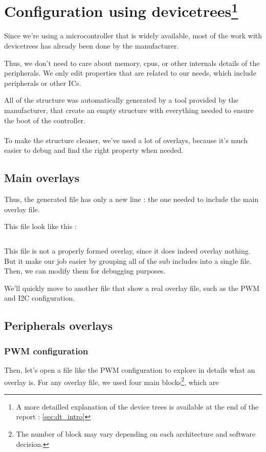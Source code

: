 \section[Configuration using devicetrees]{Configuration using devicetrees\footnote{
      A more detailled explanation of the device trees is available at the end of the report : \ref{sec:dt_intro}
  }}
Since we're using a microcontroller that is widely available, most of the work with
devicetrees has already been done by the manufacturer.

Thus, we don't need to care about memory, cpus, or other internals details of
the peripherals. We only edit properties that are related to our needs, which
include peripherals or other ICs.

All of the structure was automatically generated by a tool provided by the
manufacturer, that create an empty structure with everything needed to ensure
the boot of the controller.

\paragraph{}
To make the structure cleaner, we've used a lot of overlays, because it's much
easier to debug and find the right property when needed.

\subsection{Main overlays}
Thus, the generated file has only a new line : the one needed to include the
main overlay file.

This file look like this :

\inputminted[linenos, firstline=16, lastline=44]{devicetree}{\DeviceTree/topaze-pinctrl.dtsi}

This file is not a properly formed overlay, since it does indeed overlay
nothing. But it make our job easier by grouping all of the sub includes into a
single file. Then, we can modify them for debugging purposes.

We'll quickly move to another file that show a real overlay file, such as the
PWM and I2C configuration.

\subsection{Peripherals overlays}
\subsubsection{PWM configuration}
Then, let's open a file like the PWM configuration to explore in details what
an overlay is. For any overlay file, we used four main blocks\footnote{ The
    number of block may vary depending on each architecture and software decision.
}, which are

